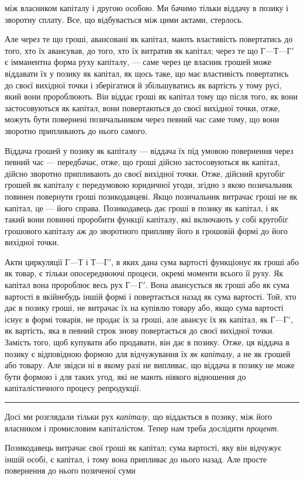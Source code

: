 \parcont{}  %
між власником капіталу і другою особою. Ми бачимо тільки
віддачу в позику і зворотну сплату. Все, що відбувається між
цими актами, стерлось.

Але через те що гроші, авансовані як капітал, мають властивість
повертатись до того, хто їх авансував, до того, хто
їх витратив як капітал; через те що $Г — Т — Г'$ є імманентна форма
руху капіталу, — саме через це власник грошей може віддавати
їх у позику як капітал, як щось таке, що має властивість повертатись
до своєї вихідної точки і зберігатися й збільшуватись як
вартість у тому русі, який вони пророблюють. Він віддає гроші як
капітал тому що після того, як вони застосовуються як капітал,
вони повертаються до своєї вихідної точки, отже, можуть бути
повернені позичальником через певний час саме тому, що вони
зворотно припливають до нього самого.

Віддача грошей у позику як капіталу — віддача їх під умовою
повернення через певний час — передбачає, отже, що гроші
дійсно застосовуються як капітал, дійсно зворотно припливають
до своєї вихідної точки. Отже, дійсний кругобіг грошей
як капіталу є передумовою юридичної угоди, згідно з якою
позичальник повинен повернути гроші позикодавцеві. Якщо позичальник
витрачає гроші не як капітал, це — його справа. Позикодавець
дає гроші в позику як капітал, і як такий вони повинні
проробити функції капіталу, які включають у собі кругобіг грошового
капіталу аж до зворотного припливу його в грошовій
формі до його вихідної точки.

Акти циркуляції $Г — Т$ і $Т — Г'$, в яких дана сума вартості функціонує
як гроші або як товар, є тільки опосереднюючі процеси,
окремі моменти всього її руху. Як капітал вона пророблює весь
рух $Г — Г'$. Вона авансується як гроші або як сума вартості
в якійнебудь іншій формі і повертається назад як сума вартості.
Той, хто дає в позику гроші, не витрачає їх на купівлю товару
або, якщо сума вартості існує в формі товарів, не продає їх за
гроші, але авансує їх як капітал, як $Г — Г'$, як вартість, яка
в певний строк знову повертається до своєї вихідної точки.
Замість того, щоб купувати або продавати, він дає в позику.
Отже, ця віддача в позику є відповідною формою для відчужування
їх \emph{як капіталу}, а не як грошей або товару. Але звідси ні
в якому разі не випливає, що віддача в позику не може бути
формою і для таких угод, які не мають ніякого відношення до
капіталістичного процесу репродукції.

\pfbreak{}

Досі ми розглядали тільки рух \emph{капіталу}, що віддається в позику,
між його власником і промисловим капіталістом. Тепер
нам треба дослідити \emph{процент}.

Позикодавець витрачає свої гроші як капітал; сума вартості,
яку він відчужує іншій особі, є капітал, і тому вона припливає
до нього назад. Але просте повернення до нього позиченої суми
\parbreak{}  %

